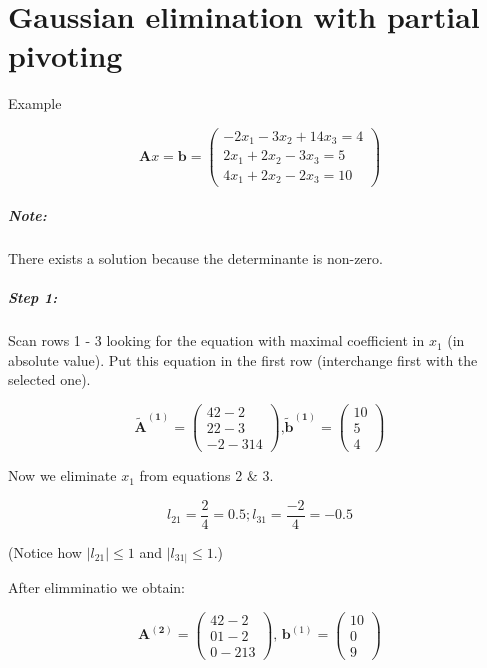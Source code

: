 \chapter{Gaussian elimination with partial pivoting}

Example %

\[ 
	\mathbf{A}x = \mathbf{b}
	=
	\begin{pmatrix}
		-2x_1 - 3x_2 + 14x_3 =  4 \\
		 2x_1 + 2x_2 -  3x_3 =  5 \\
		 4x_1 + 2x_2 -  2x_3 = 10
	\end{pmatrix}
\]

\paragraph{Note:} 
There exists a solution because the determinante is non-zero.

\paragraph{Step 1:}
Scan rows 1 - 3 looking for the equation with maximal coefficient in \(x_1\)
(in absolute value). Put this equation in the first row (interchange first with 
the selected one).

\[
	\mathbf{\tilde{A}^{(1)}} =
	\begin{pmatrix}
 		4 2 -2 \\
 		2 2 -3 \\
 		-2 -3 14      
	\end{pmatrix} \text{,}
	\mathbf{\tilde{b}^{(1)}} =
	\begin{pmatrix}
		10 \\
		 5 \\
		 4
	\end{pmatrix}
\]

Now we eliminate \(x_1\) from equations 2 \& 3.

\[
	l_{21} = \frac{2}{4} = 0.5; l_{31} = \frac{-2}{4} = -0.5
\]

(Notice how \(|l_{21}| \leq 1\) and \(|l_{31|} \leq 1\).)

After elimminatio we obtain:

\[
	\mathbf{A^{(2)}} =
	\begin{pmatrix}
 		4  2 -2 \\
 		0  1 -2 \\
 		0 -2 13      
	\end{pmatrix} \text{, }
	\mathbf{b}^{(1)} =
	\begin{pmatrix}
		10 \\
		 0 \\
		 9
	\end{pmatrix}
\]


